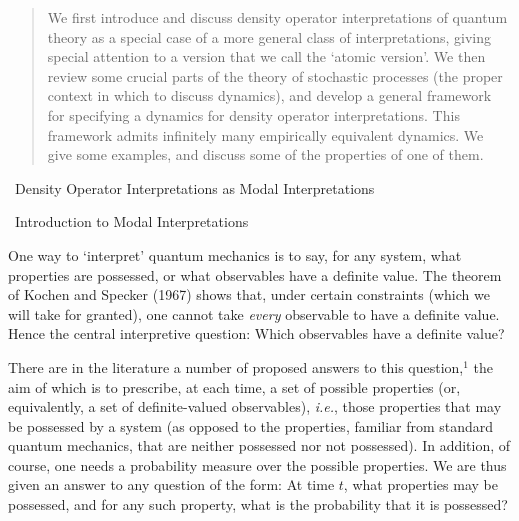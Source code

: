 \documentclass[12pt]{article}
\renewcommand{\section}[1]{\addtocounter{section}{1}
                           \setcounter{subsection}{0}
                           \setcounter{subsubsection}{0}
                           \vspace{20pt}
                           \begin{center}
                           {\large \thesection \ #1}
                           \end{center}
                           \vspace{20pt}}
\renewcommand{\subsection}[1]{\addtocounter{subsection}{1}
                           \setcounter{subsubsection}{0}
                           \vspace{20pt}
                           \begin{center}
                           \thesubsection \ #1
                           \end{center}
                           \vspace{20pt}}
\newcommand{\ie}{{\it i.e.}}         %
\begin{document}
\begin{quotation}
\noindent We first introduce and discuss density operator 
interpretations of quantum theory as a special case of a more general 
class of interpretations, giving special attention to a version that 
we call the `atomic version'.  We then review some crucial parts of 
the theory of stochastic processes (the proper context in which to 
discuss dynamics), and develop a general framework for specifying a 
dynamics for density operator interpretations.  This framework admits 
infinitely many empirically equivalent dynamics.  We give some 
examples, and discuss some of the properties of one of them.
\end{quotation}

\vspace{20pt}

\section{Density Operator Interpretations as Modal Interpretations}

\vspace{-30pt}

\subsection{Introduction to Modal Interpretations}

\noindent One way to `interpret' quantum mechanics is to say, for any
system, what properties are possessed, or what observables have a
definite value.  The theorem of Kochen and Specker (1967) shows that,
under certain constraints (which we will take for granted), one
cannot take {\it every} observable to have a definite value.  Hence
the central interpretive question: Which observables have a definite
value?

There are in the literature a number of proposed answers to this 
question,$^1$ the aim of which is to prescribe, at each time, a set of 
possible properties (or, equivalently, a set of definite-valued 
observables), \ie, those properties that may be possessed by a system 
(as opposed to the properties, familiar from standard quantum 
mechanics, that are neither possessed nor not possessed).  In 
addition, of course, one needs a probability measure over 
the possible properties.  We are thus given an answer to any question 
of the form: At time $t$, what properties may be possessed, and for 
any such property, what is the probability that it is possessed?
\end{document}
